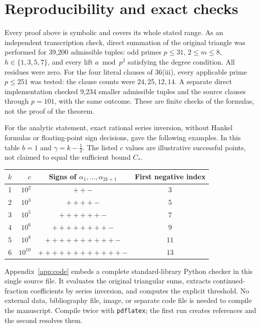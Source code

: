 \documentclass[11pt,a4paper]{article}
\theoremstyle{remark}
\begin{document}
\section{Reproducibility and exact checks}\label{sec:checks}
Every proof above is symbolic and covers its whole stated range.
As an independent transcription check, direct summation of the original
triangle was performed for 39,200 admissible tuples: odd primes
$p\le31$, $2\le m\le8$, $h\in\{1,3,5,7\}$, and every lift
$a\bmod p^2$ satisfying the degree condition. All residues were zero.
For the four literal clauses of 36(iii), every applicable prime
$p\le251$ was tested: the clause counts were $24,25,12,14$.
A separate direct implementation checked 9,234 smaller admissible
tuples and the source clauses through $p=101$, with the same outcome.
These are finite checks of the formulas, not the proof of the theorem.

For the analytic statement, exact rational series inversion, without
Hankel formulas or floating-point sign decisions, gave the following
examples. In this table $b=1$ and $\gamma=k-\tfrac12$.
The listed $c$ values are illustrative successful points, not claimed
to equal the sufficient bound $C_*$.
\begin{center}
\begin{tabular}{@{}rrcc@{}}
\toprule
$k$ & $c$ & Signs of $\alpha_1,\ldots,\alpha_{2k+1}$ & First negative index\\
\midrule
1 & $10^2$ & $++-$ & 3\\
2 & $10^3$ & $++++-$ & 5\\
3 & $10^5$ & $++++++-$ & 7\\
4 & $10^6$ & $++++++++-$ & 9\\
5 & $10^8$ & $++++++++++-$ & 11\\
6 & $10^{10}$ & $++++++++++++-$ & 13\\
\bottomrule
\end{tabular}
\end{center}

Appendix~\ref{app:code} embeds a complete standard-library Python
checker in this single source file. It evaluates the original
triangular sums, extracts continued-fraction coefficients by series
inversion, and computes the explicit threshold. No external data,
bibliography file, image, or separate code file is needed to compile
the manuscript. Compile twice with \texttt{pdflatex}; the first run
creates references and the second resolves them.

\appendix
\end{document}

